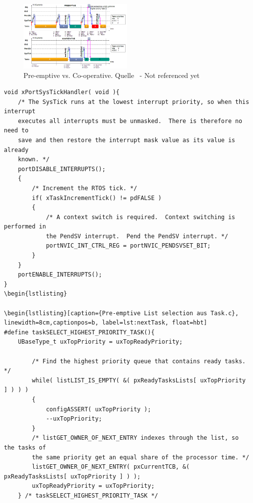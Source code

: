 \begin{figure}[ht!]
	\centering
		\includegraphics[width=0.5\textwidth]{Pictures/EMCUIT/PreemptiveCooperative.png}
	\caption{Pre-emptive vs. Co-operative. Quelle~\protect{} - Not referenced yet}
	\label{fig:PreVSCo}
\end{figure}

\begin{lstlisting}[caption={Implementierung von SysTick aus Task.c}, linewidth=8cm,captionpos=b, label=lst:SysTickS, float=hbt]
void xPortSysTickHandler( void ){
	/* The SysTick runs at the lowest interrupt priority, so when this interrupt
	executes all interrupts must be unmasked.  There is therefore no need to
	save and then restore the interrupt mask value as its value is already
	known. */
	portDISABLE_INTERRUPTS();
	{
		/* Increment the RTOS tick. */
		if( xTaskIncrementTick() != pdFALSE )
		{
			/* A context switch is required.  Context switching is performed in
			the PendSV interrupt.  Pend the PendSV interrupt. */
			portNVIC_INT_CTRL_REG = portNVIC_PENDSVSET_BIT;
		}
	}
	portENABLE_INTERRUPTS();
}
\begin{lstlisting}

\begin{lstlisting}[caption={Pre-emptive List selection aus Task.c}, linewidth=8cm,captionpos=b, label=lst:nextTask, float=hbt]
#define taskSELECT_HIGHEST_PRIORITY_TASK(){																									
	UBaseType_t uxTopPriority = uxTopReadyPriority;														
																										
		/* Find the highest priority queue that contains ready tasks. */								
		while( listLIST_IS_EMPTY( &( pxReadyTasksLists[ uxTopPriority ] ) ) )							
		{																								
			configASSERT( uxTopPriority );																
			--uxTopPriority;																			
		}																								
		/* listGET_OWNER_OF_NEXT_ENTRY indexes through the list, so the tasks of						
		the	same priority get an equal share of the processor time. */									
		listGET_OWNER_OF_NEXT_ENTRY( pxCurrentTCB, &( pxReadyTasksLists[ uxTopPriority ] ) );			
		uxTopReadyPriority = uxTopPriority;																
	} /* taskSELECT_HIGHEST_PRIORITY_TASK */
\end{lstlisting}

